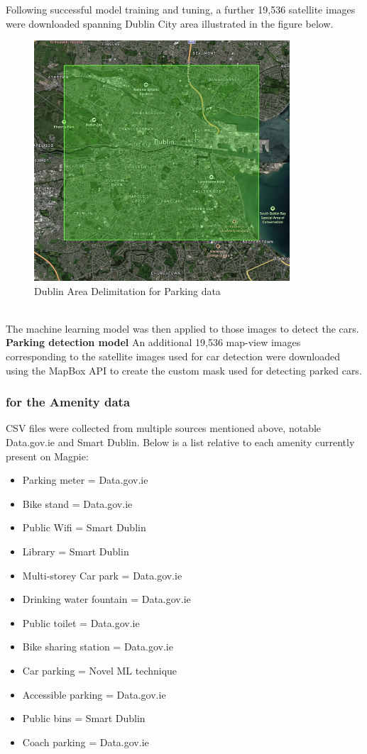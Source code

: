 Following successful model training and tuning, a further 19,536 satellite images were downloaded spanning Dublin City area illustrated in the figure below.
\begin{figure}[h!]
    \centering
    \includegraphics[width=0.85\textwidth]{images/dublin-img-area.jpg}
    \caption{Dublin Area Delimitation for Parking data}
\end{figure}\\

The machine learning model was then applied to those images to detect the cars.\\

\textbf{Parking detection model}
An additional 19,536 map-view images corresponding to the satellite images used for car detection were downloaded using the MapBox API to create the custom mask used for detecting parked cars.


\subsubsection{for the Amenity data}
CSV files were collected from multiple sources mentioned above, notable Data.gov.ie and Smart Dublin. Below is a list relative to each amenity currently present on Magpie:
\begin{itemize}
    \item Parking meter = Data.gov.ie
    \item Bike stand = Data.gov.ie
    \item Public Wifi = Smart Dublin
    \item Library = Smart Dublin
    \item Multi-storey Car park = Data.gov.ie
    \item Drinking water fountain = Data.gov.ie
    \item Public toilet = Data.gov.ie
    \item Bike sharing station = Data.gov.ie
    \item Car parking = Novel ML technique
    \item Accessible parking = Data.gov.ie
    \item Public bins = Smart Dublin
    \item Coach parking = Data.gov.ie
\end{itemize}
